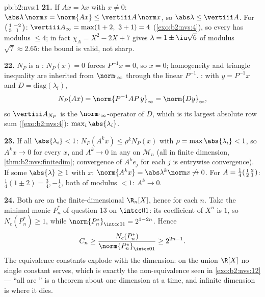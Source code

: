 \begin{solution}{pb:b2:nvs:1}
\textbf{21.} If $Ax = \lambda x$ with $x \neq 0$:
$\abs\lambda\,\norm x = \norm{Ax} \leq \vertiii A\,\norm x$,
so $\abs\lambda \leq \vertiii A$. For
$\begin{psmallmatrix}1 & -2\\ 3 & 1\end{psmallmatrix}$:
$\vertiii A_\infty = \max(1 + 2,\ 3 + 1) = 4$
(\cref{exo:b2:nvs:4}), so every  has modulus $\leq
4$; in fact $\chi_A = X^2 - 2X + 7$ gives $\lambda = 1 \pm
\iu\sqrt6$ of modulus $\sqrt7 \approx 2.65$: the bound is
valid, not sharp.

\textbf{22.} $N_P$ is a : $N_P(x) = 0$ forces $P^{-1}x = 0$,
so $x = 0$; homogeneity and triangle inequality are inherited
from $\norm\cdot_\infty$ through the linear $P^{-1}$. : with $y = P^{-1}x$ and $D = \mathrm{diag}(\lambda_i)$,
\[
N_P(Ax) = \norm{P^{-1}AP\,y}_\infty = \norm{Dy}_\infty,
\]
so $\vertiii A_{N_P}$ is the $\norm\cdot_\infty$-operator 
of $D$, which is its largest absolute row sum
(\cref{exo:b2:nvs:4}): $\max_i\abs{\lambda_i}$.

\textbf{23.} If all $\abs{\lambda_i} < 1$: $N_P(A^kx) \leq
\rho^kN_P(x)$ with $\rho = \max\abs{\lambda_i} < 1$, so $A^kx
\to 0$ for every $x$, and $A^k \to 0$ in any  on
$\mathcal{M}_n$ (all  in finite dimension,
\cref{thm:b2:nvs:finitedim}; convergence of $A^ke_j$ for each
$j$ is entrywise convergence). If some $\abs{\lambda} \geq 1$
with  $x$: $\norm{A^kx} = \abs\lambda^k\norm x
\not\to 0$. For $A = \frac14\begin{psmallmatrix}1 & 2\\ 2 &
1\end{psmallmatrix}$:  $\frac14(1 \pm 2) =
\frac34, -\frac14$, both of modulus $< 1$: $A^k \to 0$.

\textbf{24.} Both are  on the finite-dimensional
$\R_n[X]$, hence  for each $n$. Take the minimal
monic $P^*_n$ of question 13 on $\intcc01$: its coefficient of
$X^n$ is $1$, so $N_c(P^*_n) \geq 1$, while
$\norm{P^*_n}_{\intcc01} = 2^{1-2n}$. Hence
\[
C_n \geq \frac{N_c(P^*_n)}{\norm{P^*_n}_{\intcc01}}
\geq 2^{2n-1} .
\]
The equivalence constants explode with the dimension: on the
union $\R[X]$ no single constant serves, which is exactly the
non-equivalence seen in \cref{exo:b2:nvs:12} --- ``all 
are '' is a theorem about one dimension at a time,
and infinite dimension is where it dies.


\end{solution}
